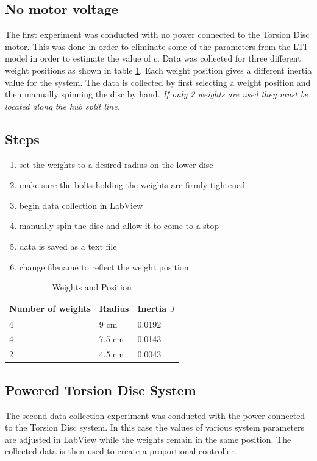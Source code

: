 \documentclass[11pt,titlepage]{article}
\begin{document}
    \subsection{No motor voltage}
        The first experiment was conducted with no power connected to the Torsion Disc motor. This was done in order to eliminate some of the parameters from the LTI model in order to estimate the value of $c$. Data was collected for three different weight positions as shown in table \ref{table:weight_pos}. Each weight position gives a different inertia value for the system. The data is collected by first selecting a weight position and then manually spinning the disc by hand. \emph{If only 2 weights are used they must be located along the hub split line.}
    \subsection*{Steps}
        \begin{enumerate}
            \itemsep0em 
            \item set the weights to a desired radius on the lower disc
            \item make sure the bolts holding the weights are firmly tightened
            \item begin data collection in LabView
            \item manually spin the disc and allow it to come to a stop
            \item data is saved as a text file
            \item change filename to reflect the weight position
        \end{enumerate}
        \begin{table}[h!]
            \centering
            \begin{tabular}{|m{4cm}|m{3cm}|m{3cm}|} 
                \hline
                Number of weights & Radius & Inertia $J$ \\ 
                \hline
                4 & 9 cm & 0.0192 \\
                \hline
                4 & 7.5 cm & 0.0143\\
                \hline
                2 & 4.5 cm & 0.0043 \\
                \hline
            \end{tabular}
            \caption{Weights and Position} \label{table:weight_pos}
        \end{table}
    \subsection{Powered Torsion Disc System}
    The second data collection experiment was conducted with the power connected to the Torsion Disc system. In this case the values of various system parameters are adjusted in LabView while the weights remain in the same position. The collected data is then used to create a proportional controller.
\end{document}
